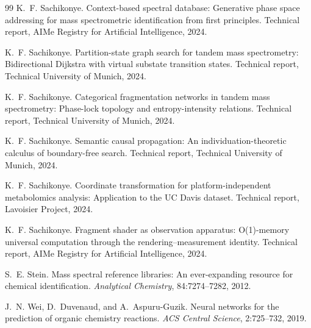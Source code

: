 \documentclass[twocolumn,10pt,a4paper]{article}
\theoremstyle{thmstyle}
\theoremstyle{definition}
\theoremstyle{remark}
\begin{document}
\begin{thebibliography}{99}
K.~F. Sachikonye.
\newblock Context-based spectral database: Generative phase space addressing
  for mass spectrometric identification from first principles.
\newblock Technical report, AIMe Registry for Artificial Intelligence, 2024.

K.~F. Sachikonye.
\newblock Partition-state graph search for tandem mass spectrometry:
  Bidirectional {D}ijkstra with virtual substate transition states.
\newblock Technical report, Technical University of Munich, 2024.

K.~F. Sachikonye.
\newblock Categorical fragmentation networks in tandem mass spectrometry:
  Phase-lock topology and entropy-intensity relations.
\newblock Technical report, Technical University of Munich, 2024.

K.~F. Sachikonye.
\newblock Semantic causal propagation: An individuation-theoretic calculus of
  boundary-free search.
\newblock Technical report, Technical University of Munich, 2024.

K.~F. Sachikonye.
\newblock Coordinate transformation for platform-independent metabolomics
  analysis: Application to the {UC Davis} dataset.
\newblock Technical report, Lavoisier Project, 2024.

K.~F. Sachikonye.
\newblock Fragment shader as observation apparatus: {O}(1)-memory universal
  computation through the rendering--measurement identity.
\newblock Technical report, AIMe Registry for Artificial Intelligence, 2024.

S.~E. Stein.
\newblock Mass spectral reference libraries: An ever-expanding resource for
  chemical identification.
\newblock \emph{Analytical Chemistry}, 84:7274--7282, 2012.

J.~N. Wei, D.~Duvenaud, and A.~Aspuru-Guzik.
\newblock Neural networks for the prediction of organic chemistry reactions.
\newblock \emph{ACS Central Science}, 2:725--732, 2019.

\end{thebibliography}
\end{document}
